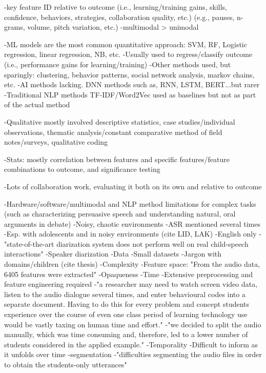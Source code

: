 \documentclass[manuscript,screen,review]{acmart}
\begin{document}



-key feature ID relative to outcome (i.e., learning/training gains, skills, confidence, behaviors, strategies, collaboration quality, etc.) (e.g., pauses, n-grams, volume, pitch variation, etc.)
    -multimodal > unimodal


-ML models are the most common quantitative approach: SVM, RF, Logistic regression, linear regression, NB, etc.
    -Usually used to regress/classify outcome (i.e., performance gains for learning/training)
    -Other methods used, but sparingly: clustering, behavior patterns, social network analysis, markov chains, etc.
    -AI methods lacking. DNN methods such as, RNN, LSTM, BERT...but rarer
    -Traditional NLP methods TF-IDF/Word2Vec used as baselines but not as part of the actual method

-Qualitative mostly involved descriptive statistics, case studies/individual observations, thematic analysis/constant comparative method of field notes/surveys, qualitative coding

-Stats: mostly correlation between features and specific features/feature combinations to outcome, and significance testing

-Lots of collaboration work, evaluating it both on its own and relative to outcome

-Hardware/software/multimodal and NLP method limitations for complex tasks (such as characterizing persuasive speech and understanding natural, oral arguments in debate)
    -Noisy, chaotic environments
    -ASR mentioned several times
        -Esp. with adolescents and in noisy environments (cite LID, LAK)
        -English only
        -"state-of-the-art diarization system does not perform well on real child-speech interactions"
    -Speaker diarization
-Data
    -Small datasets 
    -Jargon with domains/children (cite thesis)
-Complexity
    -Feature space: "From the audio data, 6405 features were extracted"
-Opaqueness
-Time   
    -Extensive preprocessing and feature engineering required
    -"a researcher may need to watch screen video data, listen to the audio dialogue several times, and enter behavioural codes into a separate document. Having to do this for every problem and concept students experience over the course of even one class period of learning technology use would be vastly taxing on human time and effort."
    -"we decided to split the audio manually, which was time consuming and, therefore, led to a lower number of students considered in the applied example."
-Temporality
    -Difficult to inform as it unfolds over time
    -segmentation
        -"difficulties segmenting the audio files in order to obtain the students-only utterances"
\end{document}
